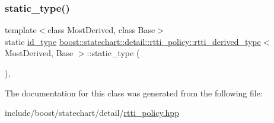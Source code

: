 \mbox{\label{classboost_1_1statechart_1_1detail_1_1rtti__policy_1_1rtti__derived__type_a0eddc3217e487ef7080cab0adae5bc80}} 
\subsubsection{\texorpdfstring{static\+\_\+type()}{static\_type()}}
{\footnotesize\ttfamily template$<$class Most\+Derived, class Base$>$ \\
static \mbox{\hyperlink{structboost_1_1statechart_1_1detail_1_1rtti__policy_a57d56a3531686fb2b92d733b5da620c2}{id\+\_\+type}} \mbox{\hyperlink{classboost_1_1statechart_1_1detail_1_1rtti__policy_1_1rtti__derived__type}{boost\+::statechart\+::detail\+::rtti\+\_\+policy\+::rtti\+\_\+derived\+\_\+type}}$<$ Most\+Derived, Base $>$\+::static\+\_\+type (\begin{DoxyParamCaption}{ }\end{DoxyParamCaption})\hspace{0.3cm}{\ttfamily [inline]}, {\ttfamily [static]}}



The documentation for this class was generated from the following file\+:\begin{DoxyCompactItemize}
\item 
include/boost/statechart/detail/\mbox{\hyperlink{rtti__policy_8hpp}{rtti\+\_\+policy.\+hpp}}\end{DoxyCompactItemize}
